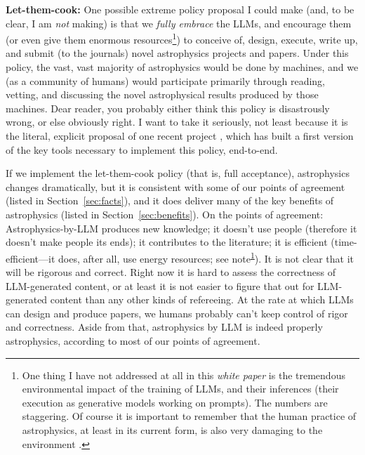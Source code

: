 \documentclass{article}
\newcommand{\documentname}{\textsl{white paper}}
\newcommand{\sectionname}{Section}
\newcommand{\secref}[1]{\sectionname~\ref{#1}}
\newcommand{\notename}{note}
\newcommand{\noteref}[1]{\notename\textsuperscript{\ref{#1}}}
\newcommand{\paragraphskip}{\medskip}
\renewcommand{\paragraph}[1]{\par\paragraphskip\noindent\textbf{#1}}
\begin{document}
\paragraph{Let-them-cook:}
One possible extreme policy proposal I could make (and, to be clear, I am \emph{not} making) is that we \emph{fully embrace} the LLMs, and encourage them (or even give them enormous resources\footnote{%
One thing I have not addressed at all in this \documentname{} is the tremendous environmental impact of the training of LLMs, and their inferences (their execution as generative models working on prompts).
The numbers are staggering.
Of course it is important to remember that the human practice of astrophysics, at least in its current form, is also very damaging to the environment \cite{low-carbon, imperative, water}.\label{note:environment}})
to conceive of, design, execute, write up, and submit (to the journals) novel astrophysics projects and papers.
Under this policy, the vast, vast majority of astrophysics would be done by machines, and we (as a community of humans) would participate primarily through reading, vetting, and discussing the novel astrophysical results produced by those machines.
Dear reader, you probably either think this policy is disastrously wrong, or else obviously right.
I want to take it seriously, not least because it is the literal, explicit proposal of one recent project \cite{denario}, which has built a first version of the key tools necessary to implement this policy, end-to-end.

If we implement the let-them-cook policy (that is, full acceptance), astrophysics changes dramatically, but it is consistent with some of our points of agreement (listed in \secref{sec:facts}), and it does deliver many of the key benefits of astrophysics (listed in \secref{sec:benefits}).
On the points of agreement: Astrophysics-by-LLM produces new knowledge; it doesn't use people (therefore it doesn't make people its ends); it contributes to the literature; it is efficient (time-efficient---it does, after all, use energy resources; see \noteref{note:environment}).
It is not clear that it will be rigorous and correct.
Right now it is hard to assess the correctness of LLM-generated content, or at least it is not easier to figure that out for LLM-generated content than any other kinds of refereeing.
At the rate at which LLMs can design and produce papers, we humans probably can't keep control of rigor and correctness.
Aside from that, astrophysics by LLM is indeed properly astrophysics, according to most of our points of agreement.
\end{document}
